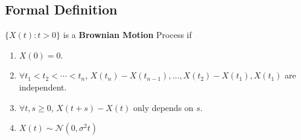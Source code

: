     \subsection{Formal Definition}
        \begin{definition}\label{Def:BrownianMotion}
            $\{X(t):t>0\}$ is a \textbf{Brownian Motion} Process if
            \begin{enumerate}
                \item $X(0) = 0$.
                \item $\forall t_1 < t_2 < \cdots < t_n$, $X(t_n)-X(t_{n-1}), \dots, X(t_2)-X(t_1), X(t_1)$ are independent.
                \item $\forall t,s \ge 0$, $X(t+s) - X(t)$ only depends on $s$.
                \item $X(t) \sim \mathcal{N}(0, \sigma^2 t)$
            \end{enumerate}
        \end{definition}
